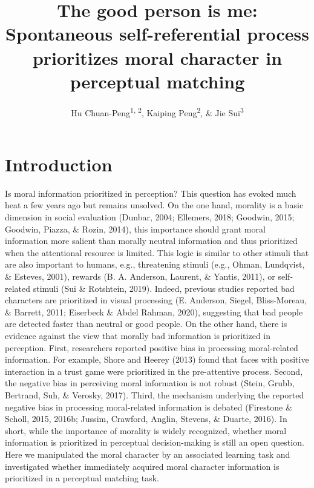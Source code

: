 \documentclass[
  man]{apa6}
\title{The good person is me: Spontaneous self-referential process prioritizes moral character in perceptual matching}
\author{Hu Chuan-Peng\textsuperscript{1, 2}, Kaiping Peng\textsuperscript{2}, \& Jie Sui\textsuperscript{3}}
\date{}
\affiliation{\vspace{0.5cm}\textsuperscript{1} Nanjing Normal University, 210024 Nanjing, China\\\textsuperscript{2} Tsinghua University, 100084 Beijing, China\\\textsuperscript{3} University of Aberdeen, Aberdeen, Scotland}
\begin{document}
\maketitle

\hypertarget{introduction}{%
\section{Introduction}\label{introduction}}

Is moral information prioritized in perception? This question has evoked much heat a few years ago but remains unsolved. On the one hand, morality is a basic dimension in social evaluation (Dunbar, 2004; Ellemers, 2018; Goodwin, 2015; Goodwin, Piazza, \& Rozin, 2014), this importance should grant moral information more salient than morally neutral information and thus prioritized when the attentional resource is limited. This logic is similar to other stimuli that are also important to humans, e.g., threatening stimuli (e.g., Ohman, Lundqvist, \& Esteves, 2001), rewards (B. A. Anderson, Laurent, \& Yantis, 2011), or self-related stimuli (Sui \& Rotshtein, 2019). Indeed, previous studies reported bad characters are prioritized in visual processing (E. Anderson, Siegel, Bliss-Moreau, \& Barrett, 2011; Eiserbeck \& Abdel Rahman, 2020), suggesting that bad people are detected faster than neutral or good people. On the other hand, there is evidence against the view that morally bad information is prioritized in perception. First, researchers reported positive bias in processing moral-related information. For example, Shore and Heerey (2013) found that faces with positive interaction in a trust game were prioritized in the pre-attentive process. Second, the negative bias in perceiving moral information is not robust (Stein, Grubb, Bertrand, Suh, \& Verosky, 2017). Third, the mechanism underlying the reported negative bias in processing moral-related information is debated (Firestone \& Scholl, 2015, 2016b; Jussim, Crawford, Anglin, Stevens, \& Duarte, 2016). In short, while the importance of morality is widely recognized, whether moral information is prioritized in perceptual decision-making is still an open question. Here we manipulated the moral character by an associated learning task and investigated whether immediately acquired moral character information is prioritized in a perceptual matching task.
\end{document}

